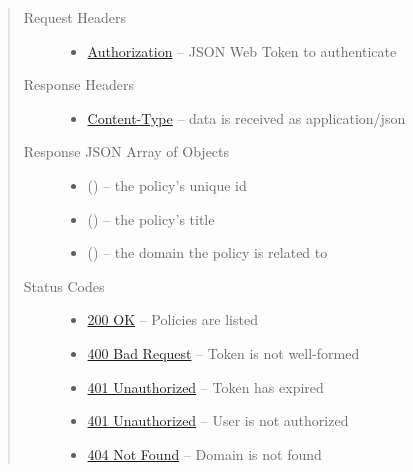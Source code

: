 \documentclass[letterpaper,10pt,english]{sphinxmanual}
\begin{document}
\begin{fulllineitems}
\begin{quote}
\begin{description}
\begin{itemize}
\end{itemize}

\item[{Request Headers}] \leavevmode\begin{itemize}
\item {} 
\href{http://tools.ietf.org/html/rfc7235\#section-4.2}{Authorization} -- JSON Web Token to authenticate

\end{itemize}

\item[{Response Headers}] \leavevmode\begin{itemize}
\item {} 
\href{http://tools.ietf.org/html/rfc7231\#section-3.1.1.5}{Content-Type} -- data is received as application/json

\end{itemize}

\item[{Response JSON Array of Objects}] \leavevmode\begin{itemize}
\item {} 
 () -- the policy's unique id

\item {} 
 () -- the policy's title

\item {} 
 () -- the domain the policy is related to

\end{itemize}

\item[{Status Codes}] \leavevmode\begin{itemize}
\item {} 
\href{http://www.w3.org/Protocols/rfc2616/rfc2616-sec10.html\#sec10.2.1}{200 OK} -- Policies are listed

\item {} 
\href{http://www.w3.org/Protocols/rfc2616/rfc2616-sec10.html\#sec10.4.1}{400 Bad Request} -- Token is not well-formed

\item {} 
\href{http://www.w3.org/Protocols/rfc2616/rfc2616-sec10.html\#sec10.4.2}{401 Unauthorized} -- Token has expired

\item {} 
\href{http://www.w3.org/Protocols/rfc2616/rfc2616-sec10.html\#sec10.4.2}{401 Unauthorized} -- User is not authorized

\item {} 
\href{http://www.w3.org/Protocols/rfc2616/rfc2616-sec10.html\#sec10.4.5}{404 Not Found} -- Domain is not found

\end{itemize}

\end{description}\end{quote}

\end{fulllineitems}
\end{document}
